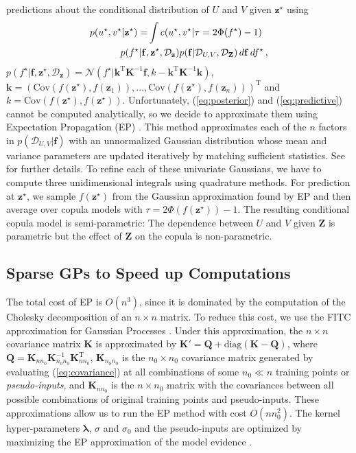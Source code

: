 \documentclass{article}
\begin{document}
predictions about the conditional distribution of $U$ and $V$ given
$\mathbf{z}^\star$ using
\begin{align}
p(u^\star,v^\star|\mathbf{z}^\star) = & \int c(u^\star,v^\star|\tau = 2\Phi(f^\star) - 1)\nonumber\\
& \hspace{-1cm} p(f^\star|\mathbf{f},\mathbf{z}^\star,\mathcal{D}_\mathbf{z})
p(\mathbf{f}|\mathcal{D}_{U,V},\mathcal{D}_\mathbf{Z})\,d\mathbf{f}\,df^\star\,,\label{eq:predictive}
\end{align}
$p(f^\star|\mathbf{f},\mathbf{z}^\star,\mathcal{D}_\mathbf{z})=
\mathcal{N}(f^\star|\mathbf{k}^\text{T}\mathbf{K}^{-1} \mathbf{f}, k - \mathbf{k}^\text{T} \mathbf{K}^{-1} \mathbf{k})$,
$\mathbf{k} = (\text{Cov}(f(\mathbf{z}^\star),f(\mathbf{z}_1)),\ldots,\text{Cov}(f(\mathbf{z}^\star),f(\mathbf{z}_n)))^\text{T}$ and
$k = \text{Cov}(f(\mathbf{z}^\star),f(\mathbf{z}^\star))$.
Unfortunately, (\ref{eq:posterior}) and (\ref{eq:predictive}) cannot be
computed analytically, so we decide to approximate them using Expectation Propagation (EP)
\cite{Minka2001}.  This method approximates each of the $n$ factors in
$p(\mathcal{D}_{U,V}|\mathbf{f})$ with an unnormalized Gaussian distribution
whose mean and variance parameters are updated iteratively by matching
sufficient statistics. See \citet{Rasmussen2006} for further details.  To refine
each of these univariate Gaussians, we have to compute three unidimensional
integrals using quadrature methods. For prediction at $\mathbf{z}^\star$, we
sample $f(\mathbf{z}^\star)$ from the Gaussian approximation found by EP and
then average over copula models with $\tau = 2 \Phi(f(\mathbf{z}^\star)) - 1$.
The resulting conditional copula model is semi-parametric: The dependence
between $U$ and $V$ given $\mathbf{Z}$ is parametric but the effect of
$\mathbf{Z}$ on the copula is non-parametric.

\subsection{Sparse GPs to Speed up Computations}

The total cost of EP is $O(n^3)$, since it is dominated by the computation of
the Cholesky decomposition of an $n\times n$ matrix.  To reduce this cost, we
use the FITC approximation for Gaussian Processes
\cite{Snelson2006,Naish-Guzman2007}. Under this approximation, the $n \times n$
covariance matrix $\mathbf{K}$ is approximated by $\mathbf{K}' =  \mathbf{Q} +
\text{diag}(\mathbf{K} - \mathbf{Q})$, where $\mathbf{Q} = \mathbf{K}_{nn_0}
\mathbf{K}_{n_0n_0}^{-1} \mathbf{K}_{nn_0}^\text{T}$, $\mathbf{K}_{n_0n_0}$ is
the $n_0 \times n_0$ covariance matrix generated by evaluating
(\ref{eq:covariance}) at all combinations of some $n_0 \ll n$ training points
or \emph{pseudo-inputs}, and $\mathbf{K}_{nn_0}$ is the $n \times n_0$ matrix
with the covariances between all possible combinations of original training
points and pseudo-inputs. These approximations allow us to run the EP method
with cost ${O}(nn_0^2)$. The kernel hyper-parameters $\boldsymbol{\lambda}$,
$\sigma$ and $\sigma_0$ and the pseudo-inputs are optimized by maximizing the
EP approximation of the model evidence \cite{Rasmussen2006}.
\end{document}
